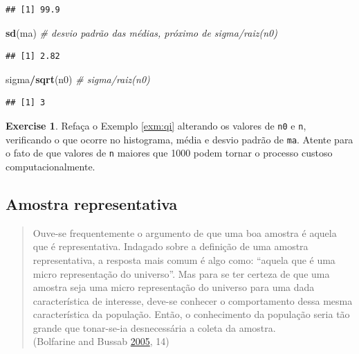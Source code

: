 \documentclass[
]{book}
\newenvironment{Shaded}{\begin{snugshade}}{\end{snugshade}}
\newcommand{\CommentTok}[1]{\textcolor[rgb]{0.56,0.35,0.01}{\textit{#1}}}
\newcommand{\KeywordTok}[1]{\textcolor[rgb]{0.13,0.29,0.53}{\textbf{#1}}}
\newcommand{\NormalTok}[1]{#1}
\newcommand{\OperatorTok}[1]{\textcolor[rgb]{0.81,0.36,0.00}{\textbf{#1}}}
\theoremstyle{definition}
\theoremstyle{definition}
\theoremstyle{definition}
\newtheorem{exercise}{Exercise}[chapter]
\theoremstyle{remark}
\begin{document}
\begin{verbatim}
## [1] 99.9
\end{verbatim}

\begin{Shaded}
\begin{Highlighting}[]
\KeywordTok{sd}\NormalTok{(ma) }\CommentTok{\# desvio padrão das médias, próximo de sigma/raiz(n0)}
\end{Highlighting}
\end{Shaded}

\begin{verbatim}
## [1] 2.82
\end{verbatim}

\begin{Shaded}
\begin{Highlighting}[]
\NormalTok{sigma}\OperatorTok{/}\KeywordTok{sqrt}\NormalTok{(n0) }\CommentTok{\# sigma/raiz(n0)}
\end{Highlighting}
\end{Shaded}

\begin{verbatim}
## [1] 3
\end{verbatim}

\begin{exercise}
\protect\hypertarget{exr:unnamed-chunk-73}{}{\label{exr:unnamed-chunk-73} }Refaça o Exemplo \ref{exm:qi} alterando os valores de \texttt{n0} e \texttt{n}, verificando o que ocorre no histograma, média e desvio padrão de \texttt{ma}. Atente para o fato de que valores de \texttt{n} maiores que 1000 podem tornar o processo custoso computacionalmente.
\end{exercise}

\hypertarget{amostra-representativa}{%
\subsection{Amostra representativa}\label{amostra-representativa}}

\begin{quote}
Ouve-se frequentemente o argumento de que uma boa amostra é aquela que é representativa. Indagado sobre a definição de uma amostra representativa, a resposta mais comum é algo como: ``aquela que é uma micro representação do universo''. Mas para se ter certeza de que uma amostra seja uma micro representação do universo para uma dada característica de interesse, deve-se conhecer o comportamento dessa mesma característica da população. Então, o conhecimento da população seria tão grande que tonar-se-ia desnecessária a coleta da amostra.\\
(Bolfarine and Bussab \protect\hyperlink{ref-bolfarine2005elementos}{2005}, 14)
\end{quote}
\end{document}
